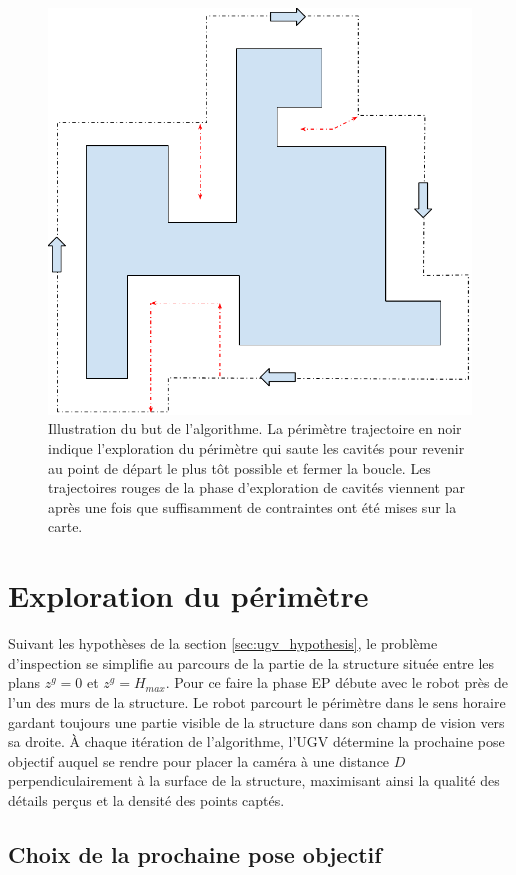 \begin{figure}[ht]
  \centering
  \includegraphics[width=0.5\linewidth]{images/ugv_goal}
  \caption{Illustration du but de l'algorithme. La périmètre trajectoire en noir indique l'exploration du périmètre qui saute les cavités pour revenir au point de départ le plus tôt possible et fermer la boucle. Les trajectoires rouges de la phase d'exploration de cavités viennent par après une fois que suffisamment de contraintes ont été mises sur la carte.}
  \label{fig:ugv_overview}
\end{figure}

\section{Exploration du périmètre} \label{sec:perimeter_exploration}

Suivant les hypothèses de la section \ref{sec:ugv_hypothesis}, le problème d'inspection se simplifie au parcours de la partie de la structure située entre les plans $z^g = 0$ et $z^g = H_{max}$. Pour ce faire la phase EP débute avec le robot près de l'un des murs de la structure. Le robot parcourt le périmètre dans le sens horaire gardant toujours une partie visible de la structure dans son champ de vision vers sa droite. À chaque itération de l'algorithme, l'UGV détermine la prochaine pose objectif auquel se rendre pour placer la caméra à une distance $D$ perpendiculairement à la surface de la structure, maximisant ainsi la qualité des détails perçus et la densité des points captés.

\subsection{Choix de la prochaine pose objectif}

